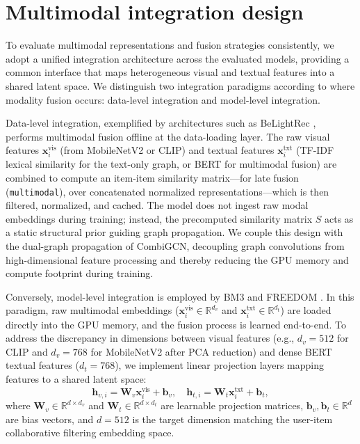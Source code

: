 \section{Multimodal integration design}

To evaluate multimodal representations and fusion strategies consistently, we adopt a unified integration architecture across the evaluated models, providing a common interface that maps heterogeneous visual and textual features into a shared latent space. We distinguish two integration paradigms according to where modality fusion occurs: data-level integration and model-level integration.

Data-level integration, exemplified by architectures such as BeLightRec \parencite{10.1007/978-981-97-9616-8_3}, performs multimodal fusion offline at the data-loading layer. The raw visual features $\mathbf{x}_i^{\text{vis}}$ (from MobileNetV2 or CLIP) and textual features $\mathbf{x}_i^{\text{txt}}$ (TF-IDF lexical similarity for the text-only graph, or BERT for multimodal fusion) are combined to compute an item-item similarity matrix---for late fusion (\texttt{multimodal}), over concatenated normalized representations---which is then filtered, normalized, and cached. The model does not ingest raw modal embeddings during training; instead, the precomputed similarity matrix $S$ acts as a static structural prior guiding graph propagation. We couple this design with the dual-graph propagation of CombiGCN, decoupling graph convolutions from high-dimensional feature processing and thereby reducing the GPU memory and compute footprint during training.

Conversely, model-level integration is employed by BM3 \parencite{10.1145/3543507.3583251} and FREEDOM \parencite{Zhou_2023}. In this paradigm, raw multimodal embeddings ($\mathbf{x}_i^{\text{vis}} \in \mathbb{R}^{d_v}$ and $\mathbf{x}_i^{\text{txt}} \in \mathbb{R}^{d_t}$) are loaded directly into the GPU memory, and the fusion process is learned end-to-end. To address the discrepancy in dimensions between visual features (e.g., $d_v = 512$ for CLIP and $d_v = 768$ for MobileNetV2 after PCA reduction) and dense BERT textual features ($d_t = 768$), we implement linear projection layers mapping features to a shared latent space:
\begin{equation}
    \mathbf{h}_{v,i} = \mathbf{W}_v \mathbf{x}_i^{\text{vis}} + \mathbf{b}_v, \quad \mathbf{h}_{t,i} = \mathbf{W}_t \mathbf{x}_i^{\text{txt}} + \mathbf{b}_t,
\end{equation}
where $\mathbf{W}_v \in \mathbb{R}^{d \times d_v}$ and $\mathbf{W}_t \in \mathbb{R}^{d \times d_t}$ are learnable projection matrices, $\mathbf{b}_v, \mathbf{b}_t \in \mathbb{R}^d$ are bias vectors, and $d = 512$ is the target dimension matching the user-item collaborative filtering embedding space. 


